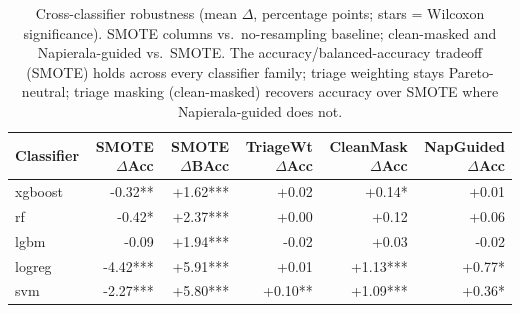 \begin{table}[t]
\centering
\caption{Cross-classifier robustness (mean $\Delta$, percentage points; stars = Wilcoxon significance). SMOTE columns vs.\ no-resampling baseline; clean-masked and Napierala-guided vs.\ SMOTE. The accuracy/balanced-accuracy tradeoff (SMOTE) holds across every classifier family; triage weighting stays Pareto-neutral; triage masking (clean-masked) recovers accuracy over SMOTE where Napierala-guided does not.}
\label{tab:classifier_ablation}
\begin{tabular}{lrrrrr}
\toprule
Classifier & SMOTE $\Delta$Acc & SMOTE $\Delta$BAcc & TriageWt $\Delta$Acc & CleanMask $\Delta$Acc & NapGuided $\Delta$Acc \\
\midrule
xgboost & -0.32** & +1.62*** & +0.02 & +0.14* & +0.01 \\
rf & -0.42* & +2.37*** & +0.00 & +0.12 & +0.06 \\
lgbm & -0.09 & +1.94*** & -0.02 & +0.03 & -0.02 \\
logreg & -4.42*** & +5.91*** & +0.01 & +1.13*** & +0.77* \\
svm & -2.27*** & +5.80*** & +0.10** & +1.09*** & +0.36* \\
\bottomrule
\end{tabular}
\end{table}
